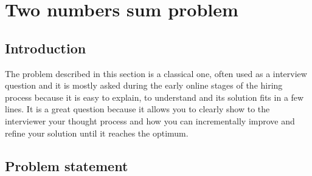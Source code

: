 %


\chapter{Two numbers sum problem}
\label{ch:two_numbers_sum}
\section*{Introduction}
The problem described in this section is a classical one, often used as a interview question and it is mostly asked during the early online stages of the hiring process because it is easy to explain, to understand and its solution fits in a few lines. It is a great question because it allows you to clearly show to the interviewer your thought process and how you can incrementally improve and refine your solution until it reaches the optimum.


\section{Problem statement}

